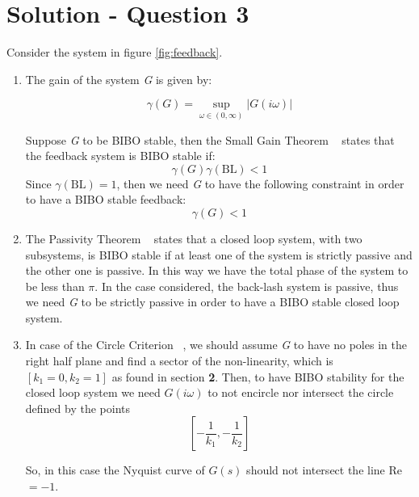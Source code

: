 \section*{Solution - Question 3}
\label{sec:sol3}
Consider the system in figure \ref{fig:feedback}.
\begin{enumerate}
\item{The gain of the system \emph{G} is given by: ~\cite[p. 209]{Khalil:2002:Nonlinear-systems:vh}

$$\gamma(G) = \sup_{\omega \in (0,\infty)} |G(i\omega)| $$ 

Suppose \emph{G} to be BIBO stable, then the Small Gain Theorem ~\cite[p. 217]{Khalil:2002:Nonlinear-systems:vh} states that the feedback system is BIBO stable if:
$$\gamma(G)\gamma(\textrm{BL}) < 1$$
Since $\gamma(\textrm{BL}) = 1$, then we need \emph{G} to have the following constraint in order to have a BIBO stable feedback:
$$\gamma(G) < 1$$}
\item{The Passivity Theorem ~\cite[p. 245]{Khalil:2002:Nonlinear-systems:vh} states that a closed loop system, with two subsystems, is BIBO stable if at least one of the system is strictly passive and the other one is passive. In this way we have the total phase of the system to be less than $\pi$. In the case considered, the back-lash system is passive, thus we need \emph{G} to be strictly passive in order to have a BIBO stable closed loop system.}
\item{In case of the Circle Criterion ~\cite[p. 265]{Khalil:2002:Nonlinear-systems:vh}, we should assume \emph{G} to have no poles in the right half plane and find  a sector of the non-linearity, which is $\left[ k_1=0,k_2=1 \right]$ as found in section \textbf{2}. Then, to have BIBO stability for the closed loop system we need $G(i\omega)$ to not encircle nor intersect the circle defined by the points $$\left[-\frac{1}{k_1}, -\frac{1}{k_2}\right] $$%

So, in this case the Nyquist curve of $G(s)$ should not intersect the line Re $=-1$.}

\end{enumerate}